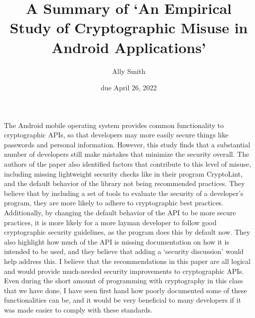 \documentclass[12pt]{article}
\title{\bf A Summary of `An Empirical Study of Cryptographic Misuse in Android
Applications'}
\author{Ally Smith}
\date{due April 26, 2022}
\begin{document}
\maketitle{}

The Android mobile operating system provides common functionality to
cryptographic APIs, so that developers may more easily secure things like
passwords and personal information. However, this study finds that a substantial
number of developers still make mistakes that minimize the security overall.
The authors of the paper also identified factors that contribute to this level
of misuse, including missing lightweight security checks like in their program
CryptoLint, and the default behavior of the library not being recommended
practices. They believe that by including a set of tools to evaluate the
security of a developer's program, they are more likely to adhere to
cryptographic best practices. Additionally, by changing the default behavior of
the API to be more secure practices, it is more likely for a more layman
developer to follow good cryptographic security guidelines, as the program does
this by default now. They also highlight how much of the API is missing
documentation on how it is intended to be used, and they believe that adding
a `security discussion' would help address this. I believe that the
recommendations in this paper are all logical and would provide much-needed
security improvements to cryptographic APIs. Even during the short amount of
programming with cryptography in this class that we have done, I have seen first
hand how poorly documented some of these functionalities can be, and it would be
very beneficial to many developers if it was made easier to comply with these
standards.
\end{document}
